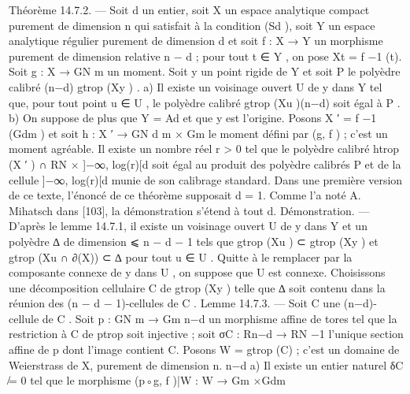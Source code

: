 \documentclass[
  10pt,
]{article}
\newenvironment{Shaded}{}{}
\newcommand{\NormalTok}[1]{#1}
\begin{document}
\begin{Shaded}
\begin{Highlighting}[]
\NormalTok{Théorème 14.7.2. — Soit d un entier, soit X un espace analytique compact purement}
\NormalTok{de dimension n qui satisfait à la condition (Sd ), soit Y un espace analytique régulier}
\NormalTok{purement de dimension d et soit f : X → Y un morphisme purement de dimension}
\NormalTok{relative n − d ; pour tout t ∈ Y , on pose Xt = f −1 (t).}
\NormalTok{   Soit g : X → GN   m un moment. Soit y un point rigide de Y et soit P le polyèdre calibré}
\NormalTok{           (n−d)}
\NormalTok{gtrop (Xy )      .}
\NormalTok{   a) Il existe un voisinage ouvert U de y dans Y tel que, pour tout point u ∈ U , le}
\NormalTok{polyèdre calibré gtrop (Xu )(n−d) soit égal à P .}
\NormalTok{   b) On suppose de plus que Y = Ad et que y est l’origine. Posons X ′ = f −1 (Gdm ) et}
\NormalTok{soit h : X ′ → GN        d}
\NormalTok{                   m × Gm le moment défini par (g, f ) ; c’est un moment agréable. Il existe}
\NormalTok{un nombre réel r \textgreater{} 0 tel que le polyèdre calibré htrop (X ′ ) ∩ RN × ]−∞, log(r)[d soit égal}
\NormalTok{au produit des polyèdre calibrés P et de la cellule ]−∞, log(r)[d munie de son calibrage}
\NormalTok{standard.}
\NormalTok{   Dans une première version de ce texte, l’énoncé de ce théorème supposait d = 1.}
\NormalTok{Comme l’a noté A. Mihatsch dans [103], la démonstration s’étend à tout d.}
\NormalTok{Démonstration. — D’après le lemme 14.7.1, il existe un voisinage ouvert U de y dans Y}
\NormalTok{et un polyèdre ∆ de dimension ⩽ n − d − 1 tels que gtrop (Xu ) ⊂ gtrop (Xy ) et gtrop (Xu ∩}
\NormalTok{∂(X)) ⊂ ∆ pour tout u ∈ U . Quitte à le remplacer par la composante connexe de y}
\NormalTok{dans U , on suppose que U est connexe.}
\NormalTok{   Choisissons une décomposition cellulaire C de gtrop (Xy ) telle que ∆ soit contenu dans}
\NormalTok{la réunion des (n − d − 1){-}cellules de C .}
\NormalTok{Lemme 14.7.3. — Soit C une (n−d){-}cellule de C . Soit p : GN       m → Gm}
\NormalTok{                                                                           n−d}
\NormalTok{                                                                                un morphisme}
\NormalTok{affine de tores tel que la restriction à C de ptrop soit injective ; soit σC : Rn−d → RN}
\NormalTok{                                                                             −1}
\NormalTok{l’unique section affine de p dont l’image contient C. Posons W = gtrop          (C) ; c’est un}
\NormalTok{domaine de Weierstrass de X, purement de dimension n.}
\NormalTok{                                                                                     n−d}
\NormalTok{   a) Il existe un entier naturel δC ̸= 0 tel que le morphisme (p◦g, f )|W : W → Gm      ×Gdm}

\end{Highlighting}
\end{Shaded}
\end{document}
